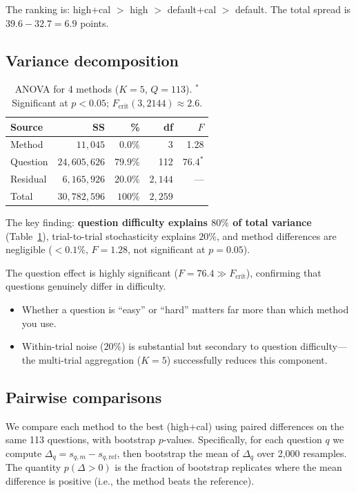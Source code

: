 \documentclass[11pt]{article}
\begin{document}
The ranking is: high+cal $>$ high $>$ default+cal $>$ default.
The total spread is $39.6 - 32.7 = 6.9$ points.

\subsection{Variance decomposition}

\begin{table}[h]
\centering
\begin{tabular}{lrrrr}
\toprule
Source & SS & \% & df & $F$ \\
\midrule
Method & $11{,}045$ & $0.0\%$ & 3 & 1.28 \\
Question & $24{,}605{,}626$ & $79.9\%$ & 112 & $76.4^*$ \\
Residual & $6{,}165{,}926$ & $20.0\%$ & $2{,}144$ & --- \\
\midrule
Total & $30{,}782{,}596$ & $100\%$ & $2{,}259$ & \\
\bottomrule
\end{tabular}
\caption{ANOVA for 4 methods ($K=5$, $Q=113$).
  $^*$Significant at $p < 0.05$; $F_{\mathrm{crit}}(3, 2144) \approx 2.6$.}
\label{tab:simple_anova}
\end{table}

The key finding: \textbf{question difficulty explains $80\%$ of total
variance} (Table~\ref{tab:simple_anova}), trial-to-trial stochasticity
explains $20\%$, and method differences are negligible
($< 0.1\%$, $F = 1.28$, not significant at $p = 0.05$).

The question effect is highly significant
($F = 76.4 \gg F_{\mathrm{crit}}$), confirming that questions genuinely
differ in difficulty.
\begin{itemize}
  \item Whether a question is ``easy'' or ``hard'' matters far more than
    which method you use.
  \item Within-trial noise ($20\%$) is substantial but secondary to question
    difficulty---the multi-trial aggregation ($K=5$) successfully reduces
    this component.
\end{itemize}

\subsection{Pairwise comparisons}

We compare each method to the best (high+cal) using paired differences
on the same 113 questions, with bootstrap $p$-values.
Specifically, for each question $q$ we compute
$\Delta_q = s_{q,m} - s_{q,\mathrm{ref}}$, then bootstrap the mean
of $\Delta_q$ over 2{,}000 resamples.  The quantity $p(\Delta > 0)$ is the
fraction of bootstrap replicates where the mean difference is positive
(i.e., the method beats the reference).
\end{document}
